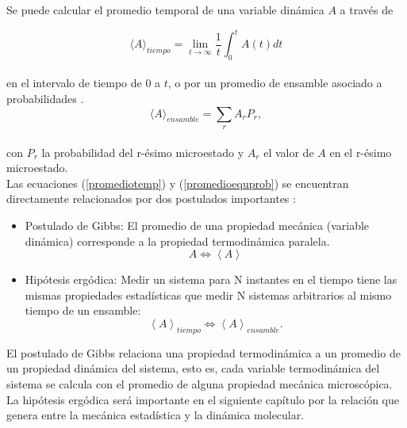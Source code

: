 Se puede calcular el promedio temporal de una variable dinámica $A$ a través de

\begin{equation} \label{promediotemp}
    \langle A\rangle_{tiempo} = \lim_{t\to\infty}\frac{1}{t}\int_0^t A(t)dt
\end{equation}\\
en el intervalo de tiempo de 0 a $t$,
o por un promedio de ensamble asociado a probabilidades \cite{tuckerman2010}. \\
\begin{equation} \label{promedioequprob}
    \langle A\rangle_{ensamble} =\sum_r A_r P_r,
\end{equation}\\
con $P_r$ la probabilidad del r-ésimo microestado y $A_r$ el valor de $A$ en el r-ésimo microestado.\\

Las ecuaciones (\ref{promediotemp}) y (\ref{promedioequprob}) se encuentran directamente relacionados por dos postulados importantes \cite{mcquarrie1976}:

\begin{itemize}
    \item Postulado de Gibbs: El promedio de una propiedad mecánica (variable dinámica) corresponde a la propiedad termodinámica paralela.\\
    
    \begin{equation} \label{gibbspostulate}
        A \Longleftrightarrow \left \langle A \right \rangle
    \end{equation}
    
    \item Hipótesis ergódica: Medir un sistema para N instantes en el tiempo tiene las mismas propiedades estadísticas que medir N sistemas arbitrarios al mismo tiempo de un ensamble:
    \begin{equation} \label{ergodichip}
        \left \langle A \right \rangle_{tiempo} \Longleftrightarrow \left \langle A \right \rangle_{ensamble}.
    \end{equation}
\end{itemize}

El postulado de Gibbs relaciona una propiedad termodinámica a un promedio de un propiedad dinámica del sistema, esto es, cada variable termodinámica del sistema se calcula con el promedio de alguna propiedad mecánica microscópica. La hipótesis ergódica será importante en el siguiente capítulo por la relación que genera entre la mecánica estadística y la dinámica molecular.\\

